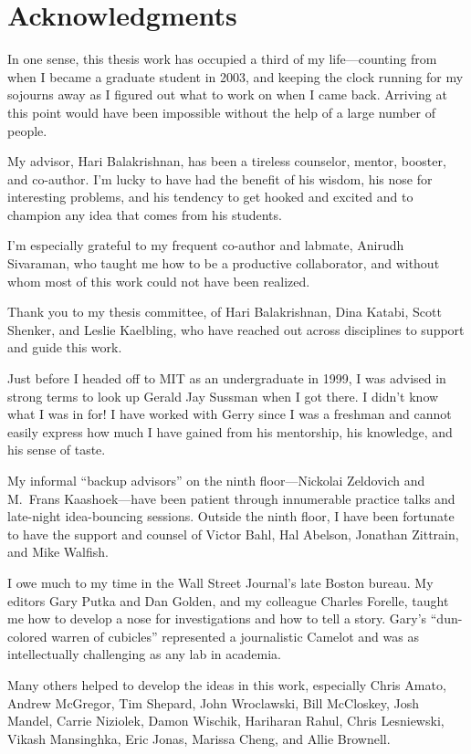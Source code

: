 \chapter*{Acknowledgments}
%

In one sense, this thesis work has occupied a third of my
life---counting from when I became a graduate student in 2003, and
keeping the clock running for my sojourns away as I figured out what
to work on when I came back. Arriving at this point would have been
impossible without the help of a large number of people.

My advisor, Hari Balakrishnan, has been a tireless counselor, mentor,
booster, and co-author. I'm lucky to have had the benefit of his
wisdom, his nose for interesting problems, and his tendency to get
hooked and excited and to champion any idea that comes from his students.

I'm especially grateful to my frequent co-author and labmate, Anirudh
Sivaraman, who taught me how to be a productive collaborator, and
without whom most of this work could not have been realized.

Thank you to my thesis committee, of Hari Balakrishnan, Dina Katabi,
Scott Shenker, and Leslie Kaelbling, who have reached out across
disciplines to support and guide this work.

Just before I headed off to MIT as an undergraduate in 1999, I was
advised in strong terms to look up Gerald Jay Sussman when I got
there. I didn't know what I was in for! I have worked with Gerry since
I was a freshman and cannot easily express how much I have gained from
his mentorship, his knowledge, and his sense of taste.

My informal ``backup advisors'' on the ninth floor---Nickolai
Zeldovich and M.~Frans Kaashoek---have been patient through
innumerable practice talks and late-night idea-bouncing
sessions. Outside the ninth floor, I have been fortunate to have the
support and counsel of Victor Bahl, Hal Abelson, Jonathan Zittrain,
and Mike Walfish.

I owe much to my time in the Wall Street Journal's late Boston
bureau. My editors Gary Putka and Dan Golden, and my colleague Charles
Forelle, taught me how to develop a nose for investigations and how to
tell a story. Gary's ``dun-colored warren of cubicles'' represented a
journalistic Camelot and was as intellectually challenging as any lab
in academia.

Many others helped to develop the ideas in this work, especially Chris
Amato, Andrew McGregor, Tim Shepard, John Wroclawski, Bill McCloskey, Josh Mandel,
Carrie Niziolek, Damon Wischik, Hariharan Rahul, Chris Lesniewski,
Vikash Mansinghka, Eric Jonas, Marissa Cheng, and Allie Brownell.

